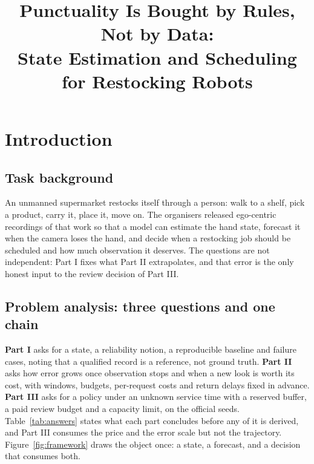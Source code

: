 \documentclass{swmcmthesis}
\title{Punctuality Is Bought by Rules, Not by Data:\\ State Estimation and Scheduling for \mbox{Restocking} Robots}
\date{\slotYear}
\newcommand{\headerteam}{Team C\slotTeamID}
\newcommand{\bodytotal}{25}
\begin{document}
\lhead{\small \headerteam}
\rhead{\small Page \thepage\ of \bodytotal}

\maketitle
\thispagestyle{summarysheet}
\lhead{\small \headerteam}
\rhead{\small Page \thepage\ of \bodytotal}

\setcounter{tocdepth}{2}
{\linespread{0.98}\selectfont
\tableofcontents}
\thispagestyle{summarysheet}
\newpage

\section{Introduction}

\subsection{Task background}

An unmanned supermarket restocks itself through a person: walk to a shelf, pick a
product, carry it, place it, move on. The organisers released ego-centric recordings of
that work so that a model can estimate the hand state, forecast it when the camera loses
the hand, and decide when a restocking job should be scheduled and how much observation
it deserves. The questions are not independent: Part I fixes what Part II extrapolates,
and that error is the only honest input to the review decision of Part III.

\subsection{Problem analysis: three questions and one chain}

\textbf{Part I} asks for a state, a reliability notion, a reproducible baseline and
failure cases, noting that a qualified record is a reference, not ground truth.
\textbf{Part II} asks how error grows once observation stops and when a new look is worth
its cost, with windows, budgets, per-request costs and return delays fixed in advance.
\textbf{Part III} asks for a policy under an unknown service time with a reserved buffer, a
paid review budget and a capacity limit, on the official seeds. Table~\ref{tab:answers}
states what each part concludes before any of it is derived, and Part III consumes the
price and the error scale but not the trajectory. Figure~\ref{fig:framework} draws the
object once: a state, a forecast, and a decision that consumes both.
\end{document}
